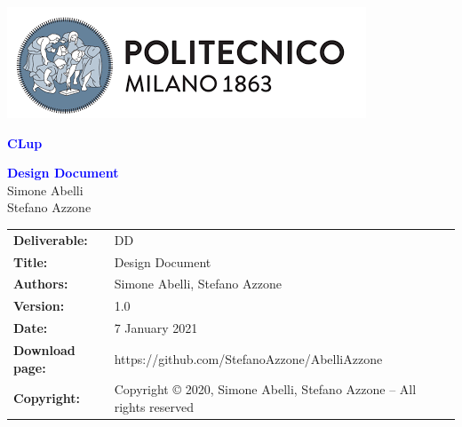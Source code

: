 
\usepackage[utf8]{inputenc}
\usepackage[dvipsnames]{xcolor}
\usepackage{listings}
\usepackage{alloy-style}



\begin{titlepage}



\centering
\includegraphics[scale=0.5]{Images/PolimiLogo}

\vspace{4cm}

{\textcolor{Blue}{\textbf{\Huge{CLup}}}} \\ [1cm]


\vspace{4cm}

{\textcolor{Blue}{\textbf{\Huge{Design Document}}}} \\ [1cm]

\vspace{4cm}
Simone Abelli \\
Stefano Azzone

\end{titlepage}

\begin{table}[h!]
\begin{tabu} to \textwidth { X[0.3,r,p] X[0.7,l,p] }
\hline

\textbf{Deliverable:} & DD\\
\textbf{Title:} & Design Document \\
\textbf{Authors:} & Simone Abelli, Stefano Azzone \\
\textbf{Version:} & 1.0 \\ 
\textbf{Date:} & 7 January 2021 \\
\textbf{Download page:} & https://github.com/StefanoAzzone/AbelliAzzone \\
\textbf{Copyright:} & Copyright © 2020, Simone Abelli, Stefano Azzone – All rights reserved \\
\hline
\end{tabu}
\end{table}




